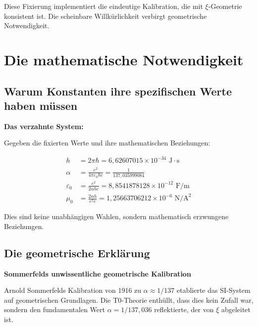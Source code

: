 \documentclass[12pt,a4paper]{article}
\begin{document}
\begin{insight}
Diese Fixierung implementiert die eindeutige Kalibration, die mit $\xi$-Geometrie konsistent ist. Die scheinbare Willk{\"u}rlichkeit verbirgt geometrische Notwendigkeit.
\end{insight}

\section{Die mathematische Notwendigkeit}

\subsection{Warum Konstanten ihre spezifischen Werte haben m{\"u}ssen}

\begin{derivation}
\textbf{Das verzahnte System:}

Gegeben die fixierten Werte und ihre mathematischen Beziehungen:

\begin{align}
h &= 2\pi\hbar = 6{,}62607015 \times 10^{-34} \text{ J}\cdot\text{s} \\
\alpha &= \frac{e^2}{4\pi\varepsilon_0\hbar c} = \frac{1}{137{,}035999084} \\
\varepsilon_0 &= \frac{e^2}{2\alpha h c} = 8{,}8541878128 \times 10^{-12} \text{ F/m} \\
\mu_0 &= \frac{2\alpha h}{e^2 c} = 1{,}25663706212 \times 10^{-6} \text{ N/A}^2
\end{align}

Dies sind keine unabh{\"a}ngigen Wahlen, sondern mathematisch erzwungene Beziehungen.
\end{derivation}

\subsection{Die geometrische Erkl{\"a}rung}

\begin{historical}
\textbf{Sommerfelds unwissentliche geometrische Kalibration}

Arnold Sommerfelds Kalibration von 1916 zu $\alpha \approx 1/137$ etablierte das SI-System auf geometrischen Grundlagen. Die T0-Theorie enth{\"u}llt, dass dies kein Zufall war, sondern den fundamentalen Wert $\alpha = 1/137{,}036$ reflektierte, der von $\xi$ abgeleitet ist.
\end{historical}
\end{document}

